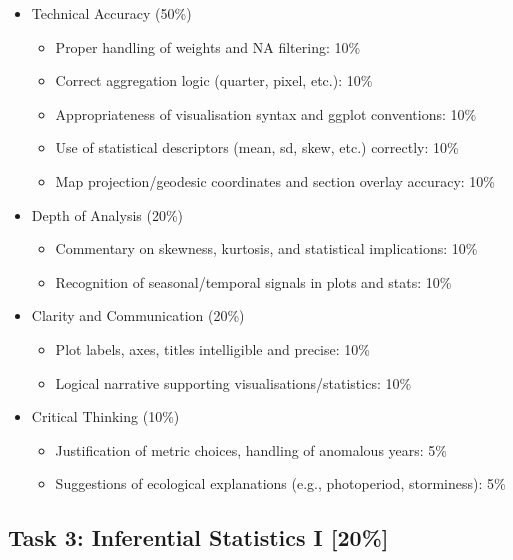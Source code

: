 \documentclass[
  10pt,
]{article}
\providecommand{\tightlist}{%
  \setlength{\itemsep}{0pt}\setlength{\parskip}{0pt}}
\begin{document}
\begin{itemize}
\tightlist
\item
  Technical Accuracy (50\%)

  \begin{itemize}
  \tightlist
  \item
    Proper handling of weights and NA filtering: 10\%
  \item
    Correct aggregation logic (quarter, pixel, etc.): 10\%
  \item
    Appropriateness of visualisation syntax and ggplot conventions: 10\%
  \item
    Use of statistical descriptors (mean, sd, skew, etc.) correctly:
    10\%
  \item
    Map projection/geodesic coordinates and section overlay accuracy:
    10\%
  \end{itemize}
\item
  Depth of Analysis (20\%)

  \begin{itemize}
  \tightlist
  \item
    Commentary on skewness, kurtosis, and statistical implications: 10\%
  \item
    Recognition of seasonal/temporal signals in plots and stats: 10\%
  \end{itemize}
\item
  Clarity and Communication (20\%)

  \begin{itemize}
  \tightlist
  \item
    Plot labels, axes, titles intelligible and precise: 10\%
  \item
    Logical narrative supporting visualisations/statistics: 10\%
  \end{itemize}
\item
  Critical Thinking (10\%)

  \begin{itemize}
  \tightlist
  \item
    Justification of metric choices, handling of anomalous years: 5\%
  \item
    Suggestions of ecological explanations (e.g., photoperiod,
    storminess): 5\%
  \end{itemize}
\end{itemize}

\subsection{Task 3: Inferential Statistics I
{[}20\%{]}}\label{task-3-inferential-statistics-i-20}
\end{document}
